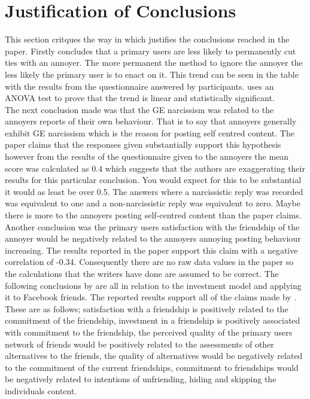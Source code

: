 \documentclass[12pt]{article}
\begin{document}
\section{Justification of Conclusions}
This section critques the way in which \cite{Carpenter} justifies the conclusions reached in the paper. Firstly \cite{Carpenter} concludes that a primary users are less likely to permanently cut ties with an annoyer. The more permanent the method to ignore the annoyer the less likely the primary user is to enact on it. This trend can be seen in the table with the results from the questionnaire answered by participants. \cite{Carpenter} uses an ANOVA test to prove that the trend is linear and statistically significant. \\
The next conclusion made was that the GE narcissism was related to the annoyers reports of their own behaviour. That is to say that annoyers generally exhibit GE narcissism which is the reason for posting self centred content. The paper claims that the responses given substantially support this hypothesis however from the results of the questionnaire given to the annoyers the mean score was calculated as 0.4 which suggests that the authors are exaggerating their results for this particular conclusion. You would expect for this to be substantial it would as least be over 0.5. The answers where a narcissistic reply was recorded was equivalent to one and a non-narcissistic reply was equivalent to zero. Maybe there is more to the annoyers posting self-centred content than the paper claims. \\
Another conclusion was the primary users satisfaction with the friendship of the annoyer would be negatively related to the annoyers annoying posting behaviour increasing. The results reported in the paper support this claim with a negative correlation of -0.34. Consequently there are no raw data values in the paper so the calculations that the writers have done are assumed to be correct.
The following conclusions by \cite{Carpenter} are all in relation to the investment model and applying it to Facebook friends. The reported results support all of the claims made by \cite{Carpenter}. These are as follows; satisfaction with a friendship is positively related to the commitment of the friendship, investment in a friendship is positively associated with commitment to the friendship, the perceived quality of the primary users network of friends would be positively related to the assessments of other alternatives to the friends, the quality of alternatives would be negatively related to the commitment of the current friendships, commitment to friendships would be negatively related to intentions of unfriending, hiding and skipping the individuals content. \\
\end{document}

